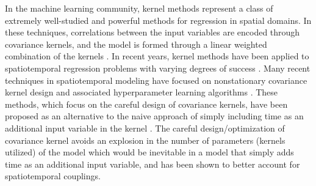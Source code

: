 In the machine learning community, kernel methods represent a class of extremely well-studied and powerful methods for regression in spatial domains. In these techniques, correlations between the input variables are encoded through covariance kernels, and the model is formed through a linear weighted combination of the kernels \cite{RasmussenWilliams2005,schoelkopf01kernelbased,scholkopf2002learning}. In recent years, kernel methods have been applied to spatiotemporal regression problems with varying degrees of success \cite{cressie2011statistics,RasmussenWilliams2005}. Many recent techniques in spatiotemporal modeling have focused on nonstationary covariance kernel design and associated hyperparameter learning algorithms \cite{garg2012AAAI,ma2003nonstationary,plagemann2008nonstationary}. These methods, which focus on the careful design of covariance kernels,  have been proposed as an alternative to the naive approach of  simply including time as an additional input variable in the kernel \cite{Chowdhary13_CDC1}. The careful design/optimization of covariance kernel avoids an explosion in the number of parameters (kernels utilized) of the model which would be inevitable in a model that simply adds time as an additional input variable, and has been shown to better account for spatiotemporal couplings. 

